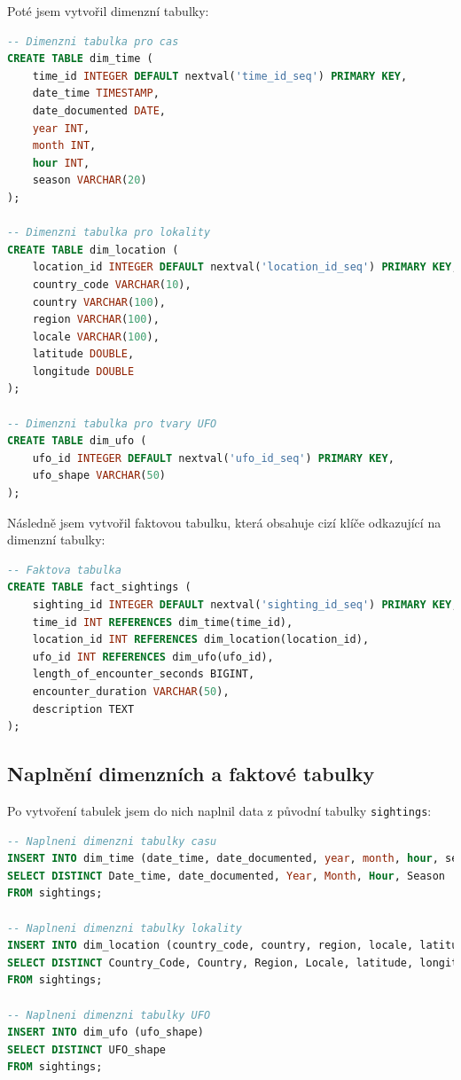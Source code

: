 \documentclass[a4paper,12pt]{article}
\begin{document}
Poté jsem vytvořil dimenzní tabulky:

\begin{lstlisting}[language=sql, caption=Vytvoření dimenzních tabulek]
-- Dimenzni tabulka pro cas
CREATE TABLE dim_time (
    time_id INTEGER DEFAULT nextval('time_id_seq') PRIMARY KEY,
    date_time TIMESTAMP,
    date_documented DATE,
    year INT,
    month INT,
    hour INT,
    season VARCHAR(20)
);

-- Dimenzni tabulka pro lokality
CREATE TABLE dim_location (
    location_id INTEGER DEFAULT nextval('location_id_seq') PRIMARY KEY,
    country_code VARCHAR(10),
    country VARCHAR(100),
    region VARCHAR(100),
    locale VARCHAR(100),
    latitude DOUBLE,
    longitude DOUBLE
);

-- Dimenzni tabulka pro tvary UFO
CREATE TABLE dim_ufo (
    ufo_id INTEGER DEFAULT nextval('ufo_id_seq') PRIMARY KEY,
    ufo_shape VARCHAR(50)
);
\end{lstlisting}

Následně jsem vytvořil faktovou tabulku, která obsahuje cizí klíče odkazující na dimenzní tabulky:

\begin{lstlisting}[language=sql, caption=Vytvoření faktové tabulky]
-- Faktova tabulka
CREATE TABLE fact_sightings (
    sighting_id INTEGER DEFAULT nextval('sighting_id_seq') PRIMARY KEY,
    time_id INT REFERENCES dim_time(time_id),
    location_id INT REFERENCES dim_location(location_id),
    ufo_id INT REFERENCES dim_ufo(ufo_id),
    length_of_encounter_seconds BIGINT,
    encounter_duration VARCHAR(50),
    description TEXT
);
\end{lstlisting}

\subsection{Naplnění dimenzních a faktové tabulky}
Po vytvoření tabulek jsem do nich naplnil data z původní tabulky \texttt{sightings}:

\begin{lstlisting}[language=sql, caption=Naplnění dimenzních tabulek]
-- Naplneni dimenzni tabulky casu
INSERT INTO dim_time (date_time, date_documented, year, month, hour, season)
SELECT DISTINCT Date_time, date_documented, Year, Month, Hour, Season
FROM sightings;

-- Naplneni dimenzni tabulky lokality
INSERT INTO dim_location (country_code, country, region, locale, latitude, longitude)
SELECT DISTINCT Country_Code, Country, Region, Locale, latitude, longitude
FROM sightings;

-- Naplneni dimenzni tabulky UFO
INSERT INTO dim_ufo (ufo_shape)
SELECT DISTINCT UFO_shape
FROM sightings;
\end{lstlisting}
\end{document}
